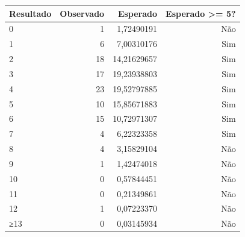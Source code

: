 \begin{tabular}{lrrr}
\toprule
Resultado & Observado & Esperado & Esperado >= 5? \\
\midrule
0 & 1 & 1,72490191 & Não \\
1 & 6 & 7,00310176 & Sim \\
2 & 18 & 14,21629657 & Sim \\
3 & 17 & 19,23938803 & Sim \\
4 & 23 & 19,52797885 & Sim \\
5 & 10 & 15,85671883 & Sim \\
6 & 15 & 10,72971307 & Sim \\
7 & 4 & 6,22323358 & Sim \\
8 & 4 & 3,15829104 & Não \\
9 & 1 & 1,42474018 & Não \\
10 & 0 & 0,57844451 & Não \\
11 & 0 & 0,21349861 & Não \\
12 & 1 & 0,07223370 & Não \\
≥13 & 0 & 0,03145934 & Não \\
\bottomrule
\end{tabular}
